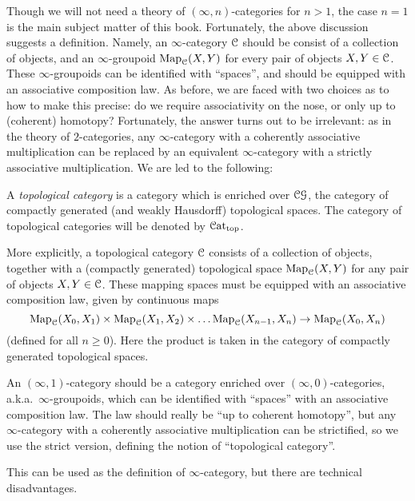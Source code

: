 Though we will not need a theory of $(\infty,n)$-categories for $n > 1$, the case $n=1$ is the main subject matter of this book. Fortunately, the above discussion suggests a definition. Namely, an $\infty$-category $\operatorname{\mathcal{C}}$ should be consist of a collection of objects, and an $\infty$-groupoid 
$\operatorname{{Map}}_{\operatorname{\mathcal{C}}}(X,Y)$ for every pair of objects $X,Y \in \operatorname{\mathcal{C}}$. These $\infty$-groupoids can be identified with ``spaces'', and should be equipped with an associative composition law.
As before, we are faced with two choices as to how to make this
precise: do we require associativity on the nose, or only up to (coherent)
homotopy? Fortunately, the answer turns out to be irrelevant:
as in the theory of $2$-categories, any $\infty$-category
with a coherently associative multiplication can be replaced by an
equivalent $\infty$-category with a strictly associative
multiplication. We are led to the following:

\begin{definition}\label{ic}
A {\it topological category} is a category which is enriched over
$\operatorname{\mathcal{C}\mathcal{G}}$, the category of compactly generated (and weakly Hausdorff) topological
spaces. The category of topological categories will be denoted by
$\operatorname{\mathcal{C}at_{\text{top}}}$.
\end{definition}

More explicitly, a topological category $\operatorname{\mathcal{C}}$ consists of a
collection of objects, together with a (compactly generated)
topological space $\operatorname{{Map}}_{\operatorname{\mathcal{C}}}(X,Y)$ for any pair of objects $X,Y
\in \operatorname{\mathcal{C}}$. These mapping spaces must be equipped with an
associative composition law, given by continuous maps
$$\operatorname{{Map}}_{\operatorname{\mathcal{C}}}(X_0, X_1) \times \operatorname{{Map}}_{\operatorname{\mathcal{C}}}(X_1, X_2) \times
\ldots \operatorname{{Map}}_{\operatorname{\mathcal{C}}}(X_{n-1},X_n) \rightarrow
\operatorname{{Map}}_{\operatorname{\mathcal{C}}}(X_0,X_n)$$ (defined for all $n \geq 0$). Here the
product is taken in the category of compactly generated
topological spaces.
\begin{shaded}
An $(\infty,1)$-category should be a category enriched over $(\infty,0)$-categories, a.k.a.\ $\infty$-groupoids, which can be identified with ``spaces'' with an associative composition law. The law should really be ``up to coherent homotopy'', but any $\infty$-category
with a coherently associative multiplication can be strictified, so we use the strict version, defining the notion of ``topological category''.

This can be used as the definition of $\infty$-category, but there are technical disadvantages.
\end{shaded}


